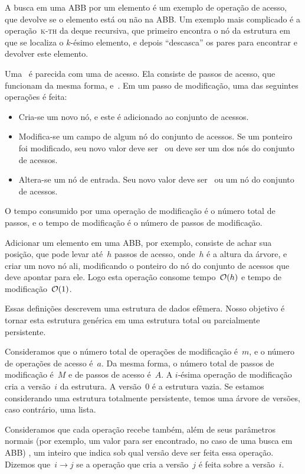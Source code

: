 \documentclass[main.tex]{subfiles}
\begin{document}
A busca em uma ABB por um elemento é um exemplo de operação de acesso, que devolve se o elemento está ou não na ABB. Um exemplo mais complicado é a operação~\textsc{k-th} da deque recursiva, que primeiro encontra o nó da estrutura em que se localiza o $k$-ésimo elemento, e depois ``descasca'' os pares para encontrar e devolver este elemento.

Uma~ é parecida com uma de acesso. Ela consiste de passos de acesso, que funcionam da mesma forma, e~. Em um passo de modificação, uma das seguintes operações é feita:
\begin{itemize}
	\item Cria-se um novo nó, e este é adicionado ao conjunto de acessos.
	\item Modifica-se um campo de algum nó do conjunto de acessos. Se um ponteiro foi modificado, seu novo valor deve ser~ ou deve ser um dos nós do conjunto de acessos.
	\item Altera-se um nó de entrada. Seu novo valor deve ser~ ou um nó do conjunto de acessos.
\end{itemize}

O tempo consumido por uma operação de modificação é o número total de passos, e o tempo de modificação é o número de passos de modificação.

Adicionar um elemento em uma ABB, por exemplo, consiste de achar sua posição, que pode levar até~$h$ passos de acesso, onde~$h$ é a altura da árvore, e criar um novo nó ali, modificando o ponteiro do nó do conjunto de acessos que deve apontar para ele. Logo esta operação consome tempo~$\mathcal{O}(h)$ e tempo de modificação~$\mathcal{O}(1)$.

Essas definições descrevem uma estrutura de dados efêmera. Nosso objetivo é tornar esta estrutura genérica em uma estrutura total ou parcialmente persistente.

Consideramos que o número total de operações de modificação é~$m$, e o número de operações de acesso é~$a$. Da mesma forma, o número total de passos de modificação é~$M$ e de passos de acesso é~$A$. A $i$-ésima operação de modificação cria a versão~$i$ da estrutura. A versão~0 é a estrutura vazia. Se estamos considerando uma estrutura totalmente persistente, temos uma árvore de versões, caso contrário, uma lista.

Consideramos que cada operação recebe também, além de seus parâmetros normais (por exemplo, um valor para ser encontrado, no caso de uma busca em ABB) , um inteiro que indica sob qual versão deve ser feita essa operação. Dizemos que~$i \rightarrow j$ se a operação que cria a versão~$j$ é feita sobre a versão~$i$.
\end{document}
